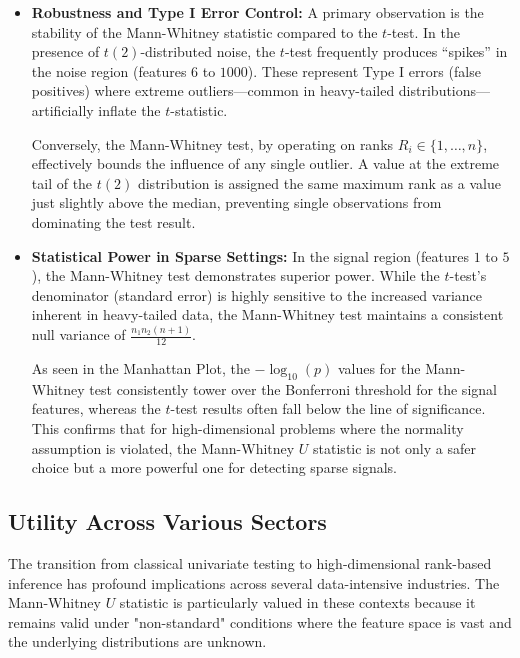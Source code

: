 \documentclass[10pt]{article}
\begin{document}
\begin{itemize}
    \item \textbf{Robustness and Type I Error Control:}
    A primary observation is the stability of the Mann-Whitney statistic compared to the $t$-test. In the presence of $t(2)$-distributed noise, the $t$-test frequently produces ``spikes'' in the noise region (features $6$ to $1000$). These represent Type I errors (false positives) where extreme outliers—common in heavy-tailed distributions—artificially inflate the $t$-statistic. 

Conversely, the Mann-Whitney test, by operating on ranks $R_i \in \{1, \dots, n\}$, effectively bounds the influence of any single outlier. A value at the extreme tail of the $t(2)$ distribution is assigned the same maximum rank as a value just slightly above the median, preventing single observations from dominating the test result.
\item \textbf{Statistical Power in Sparse Settings:}
In the signal region (features $1$ to $5$), the Mann-Whitney test demonstrates superior power. While the $t$-test's denominator (standard error) is highly sensitive to the increased variance inherent in heavy-tailed data, the Mann-Whitney test maintains a consistent null variance of $\frac{n_1 n_2 (n+1)}{12}$. 

As seen in the Manhattan Plot, the $-\log_{10}(p)$ values for the Mann-Whitney test consistently tower over the Bonferroni threshold for the signal features, whereas the $t$-test results often fall below the line of significance. This confirms that for high-dimensional problems where the normality assumption is violated, the Mann-Whitney $U$ statistic is not only a safer choice but a more powerful one for detecting sparse signals.
\end{itemize}

\subsection{Utility Across Various Sectors}

The transition from classical univariate testing to high-dimensional rank-based inference has profound implications across several data-intensive industries. The Mann-Whitney $U$ statistic is particularly valued in these contexts because it remains valid under "non-standard" conditions where the feature space is vast and the underlying distributions are unknown.
\end{document}

